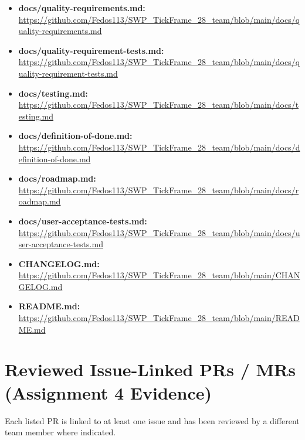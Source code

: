 \documentclass[11pt,a4paper]{article}
\begin{document}
\begin{itemize}[leftmargin=*]
    \item \textbf{docs/quality-requirements.md:} \url{https://github.com/Fedos113/SWP_TickFrame_28_team/blob/main/docs/quality-requirements.md}
    \item \textbf{docs/quality-requirement-tests.md:} \url{https://github.com/Fedos113/SWP_TickFrame_28_team/blob/main/docs/quality-requirement-tests.md}
    \item \textbf{docs/testing.md:} \url{https://github.com/Fedos113/SWP_TickFrame_28_team/blob/main/docs/testing.md}
    \item \textbf{docs/definition-of-done.md:} \url{https://github.com/Fedos113/SWP_TickFrame_28_team/blob/main/docs/definition-of-done.md}
    \item \textbf{docs/roadmap.md:} \url{https://github.com/Fedos113/SWP_TickFrame_28_team/blob/main/docs/roadmap.md}
    \item \textbf{docs/user-acceptance-tests.md:} \url{https://github.com/Fedos113/SWP_TickFrame_28_team/blob/main/docs/user-acceptance-tests.md}
    \item \textbf{CHANGELOG.md:} \url{https://github.com/Fedos113/SWP_TickFrame_28_team/blob/main/CHANGELOG.md}
    \item \textbf{README.md:} \url{https://github.com/Fedos113/SWP_TickFrame_28_team/blob/main/README.md}
\end{itemize}

\section{Reviewed Issue-Linked PRs / MRs (Assignment 4 Evidence)}

Each listed PR is linked to at least one issue and has been reviewed by a different team member where indicated.
\end{document}
